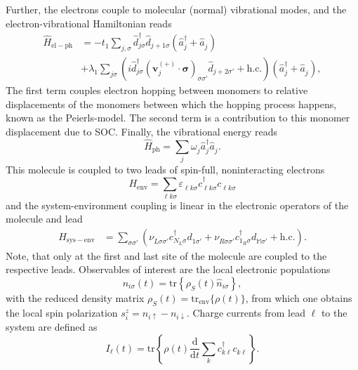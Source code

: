 \documentclass{article}
\newcommand{\dif}{\mathrm{d}}
\renewcommand{\vec}[1]{\mathbf{#1}}
\newcommand{\pdagger}{{\phantom{\dagger}}}
\newcommand{\tr}[1]{\mathrm{tr}\left\{#1\right\}}
\begin{document}
Further, the electrons couple to molecular (normal) vibrational modes, and the electron-vibrational Hamiltonian reads 
\begin{align}
	\hat{H}_\mathrm{el-ph} &= - t_1^\pdagger \sum_{j,\sigma}  \hat{d}_{j\sigma}^\dagger \hat{d}_{j+1\sigma}^\pdagger (\hat{a}_{j}^\dagger + \hat{a}_{j}^\pdagger) \\ & + \lambda_1^\pdagger\sum_{j\sigma} (i \hat{d}_{j\sigma}^\dagger (\vec{v}_j^{(+)} \cdot \bm{\sigma})_{\sigma\sigma'}^\pdagger \hat{d}_{j+2\sigma'}^\pdagger +\mathrm{h.c.})(\hat{a}_{j}^\dagger + \hat{a}_{j}^\pdagger),\label{eq:HelPh}
\end{align}
The first term couples electron hopping between monomers to relative displacements of the monomers between which the hopping process happens, known as the Peierls-model. The second term is a contribution to this monomer displacement due to SOC. Finally, the vibrational energy reads 
\begin{equation}
	\hat{H}_\mathrm{ph} = \sum_{j} \omega_{j}^\pdagger \hat{a}_{j}^\dagger \hat{a}_{j}^\pdagger.
	 \label{eq:HPh} 
\end{equation}
This molecule is coupled to two leads of spin-full, noninteracting electrons
\begin{equation}
	H_\mathrm{env} = \sum_{\ell k\sigma} \varepsilon_{\ell k\sigma}^\pdagger c_{\ell k\sigma}^\dagger c_{\ell k\sigma}^\pdagger \label{eq:LeadHamiltonian}
\end{equation}
and the system-environment coupling is linear in the electronic operators of the molecule and lead
\begin{align}
	H_\mathrm{sys-env} &= \sum_{\sigma\sigma'}(\nu_{L\sigma\sigma'}^\pdagger c_{N_L\sigma}^\dagger d_{1\sigma'}^\pdagger + \nu_{R\sigma\sigma'}^\pdagger c_{1_R\sigma}^\dagger d_{\mathbb{M}\sigma'}^\pdagger + \mathrm{h.c.}). \label{eq:LeadSysHamiltonian}
\end{align} 
Note, that only at the first and last site of the molecule are coupled to the respective leads. Observables of interest are the local electronic populations
\begin{equation}
	n_{i\sigma}(t) = \tr{\rho_S(t) \hat{n}_{i\sigma}},
\end{equation}
with the reduced density matrix $\rho_S(t) = \mathrm{tr}_\mathrm{env}\{\rho(t)\}$, from which one obtains the local spin polarization $s^z_i = n_{i\uparrow}-n_{i\downarrow}$. Charge currents from lead $\ell$ to the system are defined as
\begin{equation}
	I_\ell(t) = \tr{\rho(t) \frac{\dif}{\dif t}\sum_k c^\dagger_{k\ell}c^\pdagger_{k\ell}}.
\end{equation}
\end{document}
